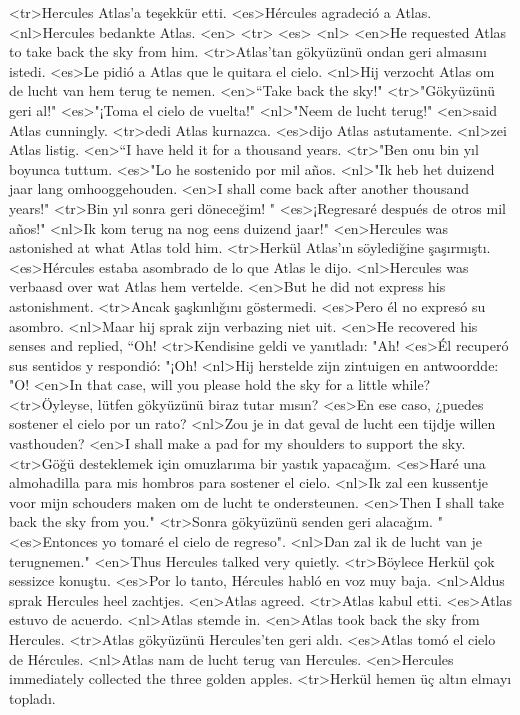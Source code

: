 <tr>Hercules Atlas'a teşekkür etti.
<es>Hércules agradeció a Atlas.
<nl>Hercules bedankte Atlas.
<en>
<tr>
<es>
<nl>
<en>He requested Atlas to take back the sky from him.
<tr>Atlas'tan gökyüzünü ondan geri almasını istedi.
<es>Le pidió a Atlas que le quitara el cielo.
<nl>Hij verzocht Atlas om de lucht van hem terug te nemen.
<en>“Take back the sky!"
<tr>"Gökyüzünü geri al!"
<es>"¡Toma el cielo de vuelta!"
<nl>"Neem de lucht terug!"
<en>said Atlas cunningly.
<tr>dedi Atlas kurnazca.
<es>dijo Atlas astutamente.
<nl>zei Atlas listig.
<en>“I have held it for a thousand years.
<tr>"Ben onu bin yıl boyunca tuttum.
<es>"Lo he sostenido por mil años.
<nl>"Ik heb het duizend jaar lang omhooggehouden.
<en>I shall come back after another thousand years!"
<tr>Bin yıl sonra geri döneceğim! "
<es>¡Regresaré después de otros mil años!"
<nl>Ik kom terug na nog eens duizend jaar!"
<en>Hercules was astonished at what Atlas told him.
<tr>Herkül Atlas'ın söylediğine şaşırmıştı.
<es>Hércules estaba asombrado de lo que Atlas le dijo.
<nl>Hercules was verbaasd over wat Atlas hem vertelde.
<en>But he did not express his astonishment.
<tr>Ancak şaşkınlığını göstermedi.
<es>Pero él no expresó su asombro.
<nl>Maar hij sprak zijn verbazing niet uit.
<en>He recovered his senses and replied, “Oh!
<tr>Kendisine geldi ve yanıtladı: "Ah!
<es>Él recuperó sus sentidos y respondió: "¡Oh!
<nl>Hij herstelde zijn zintuigen en antwoordde: "O!
<en>In that case, will you please hold the sky for a little while?
<tr>Öyleyse, lütfen gökyüzünü biraz tutar mısın?
<es>En ese caso, ¿puedes sostener el cielo por un rato?
<nl>Zou je in dat geval de lucht een tijdje willen vasthouden?
<en>I shall make a pad for my shoulders to support the sky.
<tr>Göğü desteklemek için omuzlarıma bir yastık yapacağım.
<es>Haré una almohadilla para mis hombros para sostener el cielo.
<nl>Ik zal een kussentje voor mijn schouders maken om de lucht te ondersteunen.
<en>Then I shall take back the sky from you."
<tr>Sonra gökyüzünü senden geri alacağım. "
<es>Entonces yo tomaré el cielo de regreso".
<nl>Dan zal ik de lucht van je terugnemen."
<en>Thus Hercules talked very quietly.
<tr>Böylece Herkül çok sessizce konuştu.
<es>Por lo tanto, Hércules habló en voz muy baja.
<nl>Aldus sprak Hercules heel zachtjes.
<en>Atlas agreed.
<tr>Atlas kabul etti.
<es>Atlas estuvo de acuerdo.
<nl>Atlas stemde in.
<en>Atlas took back the sky from Hercules.
<tr>Atlas gökyüzünü Hercules'ten geri aldı.
<es>Atlas tomó el cielo de Hércules.
<nl>Atlas nam de lucht terug van Hercules.
<en>Hercules immediately collected the three golden apples.
<tr>Herkül hemen üç altın elmayı topladı.
